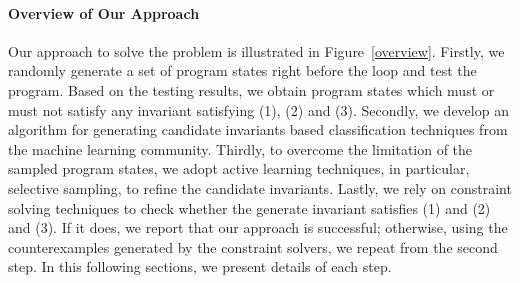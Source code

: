 \paragraph{Overview of Our Approach} 
Our approach to solve the problem is illustrated in Figure~\ref{overview}. 
Firstly, we randomly generate a set of program states right before the loop and test the program. 
Based on the testing results, we obtain program states which must or must not satisfy any invariant satisfying (1), (2) and (3). 
Secondly, we develop an algorithm for generating candidate invariants based classification techniques from the machine learning community. 
Thirdly, to overcome the limitation of the sampled program states, 
we adopt active learning techniques, in particular, selective sampling, to refine the candidate invariants. 
Lastly, we rely on constraint solving techniques to check whether the generate invariant satisfies (1) and (2) and (3). 
If it does, we report that our approach is successful; 
otherwise, using the counterexamples generated by the constraint solvers, we repeat from the second step. 
In this following sections, we present details of each step.
